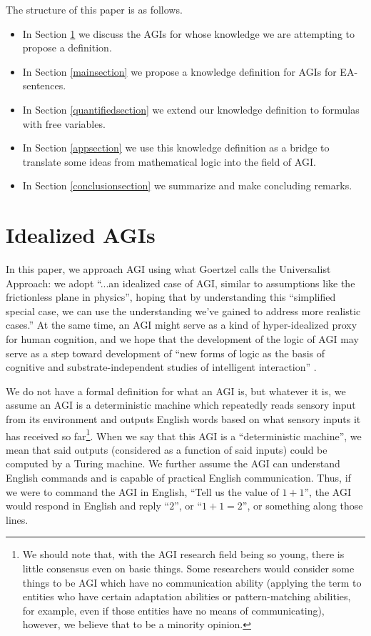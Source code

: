 \documentclass[runningheads]{llncs}
\begin{document}
The structure of this paper is as follows.
\begin{itemize}
  \item In Section \ref{agisection} we discuss the AGIs for whose knowledge we are
  attempting to propose a definition.
  \item In Section \ref{mainsection} we propose a knowledge definition for
  AGIs for EA-sentences.
  \item In Section \ref{quantifiedsection} we extend our knowledge definition
  to formulas with free variables.
  \item In Section \ref{appsection} we use this knowledge definition as a bridge
  to translate some ideas from mathematical logic into the field of AGI.
  \item In Section \ref{conclusionsection} we summarize and make concluding remarks.
\end{itemize}

\section{Idealized AGIs}
\label{agisection}

In this paper, we approach AGI using what
Goertzel \cite{goertzel2014artificial} calls
the Universalist Approach:
we adopt ``...an idealized case of AGI, similar to
assumptions like the frictionless plane in physics'', hoping that by
understanding this ``simplified special
case, we can use the understanding we've gained to address more realistic
cases.'' At the same time, an AGI might serve as a kind of hyper-idealized
proxy for human cognition, and we hope that the development of the logic
of AGI may serve as a step toward development of ``new forms of logic as
the basis of cognitive and substrate-independent studies of intelligent interaction''
\cite{cerone2019interdisciplinary}.

We do not have a formal definition for what an AGI is, but whatever it is,
we assume an AGI is a deterministic machine
which repeatedly reads sensory input from its environment and outputs
English words based on what sensory inputs it has received so
far\footnote{We should note that, with the AGI research field being so young,
there is little consensus even on basic things. Some researchers would
consider some things to be AGI which have no communication ability (applying the
term to entities who have certain adaptation abilities or
pattern-matching abilities, for example, even if those entities have no
means of communicating), however, we believe that to be a minority opinion.}.
When we say that this AGI is a ``deterministic machine'', we mean that
said outputs (considered as a function of said inputs) could be computed
by a Turing machine. We further assume the AGI can understand English
commands and is capable of practical English communication. Thus, if
we were to command the AGI in English, ``Tell us the value of $1+1$'',
the AGI would respond in English and reply ``$2$'', or ``$1+1=2$'',
or something along those lines.
\end{document}
